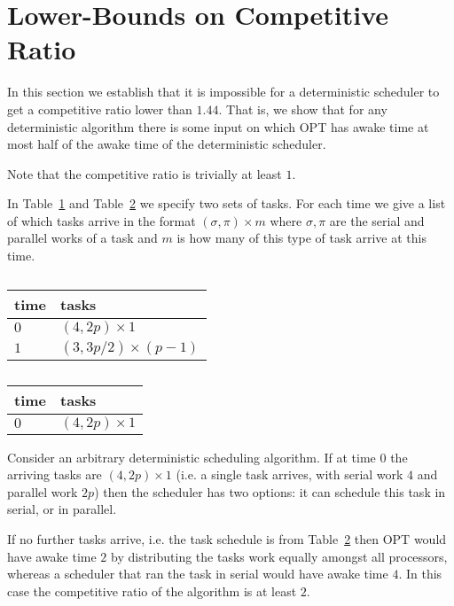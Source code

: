 \section{Lower-Bounds on Competitive Ratio}

In this section we establish that it is impossible for a
deterministic scheduler to get a competitive ratio lower than
$1.44$. That is, we show that for any deterministic algorithm there
is some input on which OPT has awake time at most half of the
awake time of the deterministic scheduler.

Note that the competitive ratio is trivially at least $1$.

In Table~\ref{tab:lowerboundFork1} and
Table~\ref{tab:lowerboundFork2} we specify two sets of tasks.
For each time we give a list of which tasks arrive in the format
$(\sigma, \pi)\times m$ where $\sigma, \pi$ are the serial and
parallel works of a task and $m$ is how many of this type of task
arrive at this time.

\begin{table}[H]
\caption{}
\label{tab:lowerboundFork1}
\centering
\begin{tabular}{|l|l|}
\hline
time & tasks                    \\ \hline
$0$  & $(4, 2p) \times 1$       \\ \hline
$1$  & $(3, 3p/2) \times (p-1)$ \\ \hline
\end{tabular}
\end{table}

\begin{table}[H]
\caption{}
\label{tab:lowerboundFork2}
\centering
\begin{tabular}{|l|l|}
\hline
time & tasks                    \\ \hline
$0$  & $(4, 2p) \times 1$       \\ \hline
\end{tabular}
\end{table}

Consider an arbitrary deterministic scheduling algorithm. If at
time $0$ the arriving tasks are $(4, 2p)\times 1$ (i.e. a single
task arrives, with serial work $4$ and parallel work $2p$) then
the scheduler has two options: it can schedule this task in
serial, or in parallel.

If no further tasks arrive, i.e. the task schedule is from
Table~\ref{tab:lowerboundFork2} then OPT would have awake time
$2$ by distributing the tasks work equally amongst all
processors, whereas a scheduler that ran the task in serial would
have awake time $4$. In this case the competitive ratio of the
algorithm is at least $2$.

